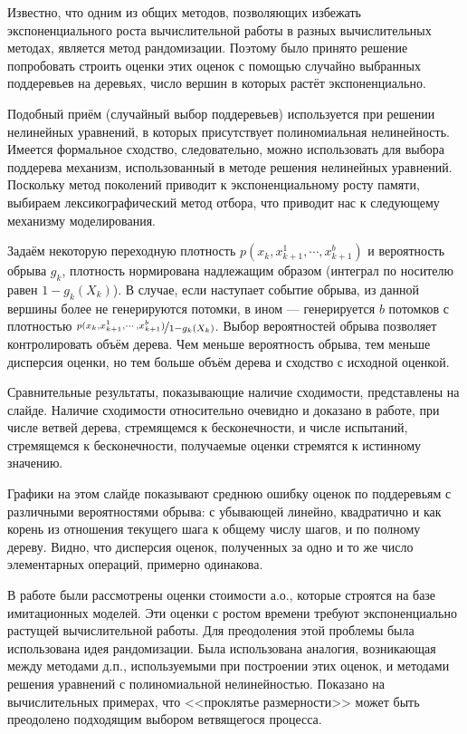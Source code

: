 \documentclass{article}
\begin{document}
Известно, что одним из общих методов, позволяющих избежать экспоненциального роста вычислительной работы в разных вычислительных методах, является метод рандомизации. Поэтому было принято решение попробовать строить оценки этих оценок с помощью случайно  выбранных поддеревьев на деревьях, число вершин в которых растёт экспоненциально.

Подобный приём (случайный выбор поддеревьев) используется при решении нелинейных уравнений, в которых присутствует полиномиальная нелинейность. Имеется формальное сходство, следовательно, можно использовать для выбора поддерева механизм, использованный в методе решения нелинейных уравнений. Поскольку метод поколений приводит к экспоненциальному росту памяти, выбираем лексикографический метод отбора, что приводит нас к следующему механизму моделирования.

Задаём некоторую переходную плотность $p(x_k, x_{k+1}^1, \cdots, x_{k+1}^b)$ и вероятность обрыва $g_k$, плотность нормирована надлежащим образом (интеграл по носителю равен $1-g_k(X_k)$). В случае, если наступает событие обрыва, из данной вершины более не генерируются потомки, в ином --- генерируется $b$ потомков с плотностью $\nicefrac{p(x_k, x_{k+1}^1, \cdots, x_{k+1}^b)}{1 - g_k(X_k)}$. Выбор вероятностей обрыва позволяет контролировать объём дерева. Чем меньше  вероятность обрыва, тем меньше дисперсия оценки, но тем больше объём дерева и сходство с исходной оценкой.

Сравнительные результаты, показывающие наличие сходимости, представлены на слайде. Наличие сходимости относительно очевидно и доказано в работе, при числе ветвей дерева, стремящемся к бесконечности, и числе испытаний, стремящемся к бесконечности, получаемые оценки стремятся к истинному значению.

Графики на этом слайде показывают среднюю ошибку оценок по поддеревьям с различными вероятностями обрыва: с убывающей линейно, квадратично и как корень из отношения текущего шага к общему числу шагов, и по полному дереву. Видно, что дисперсия оценок, полученных за одно и то же число элементарных операций, примерно одинакова.

В работе были рассмотрены оценки стоимости а.о., которые строятся на базе имитационных моделей. Эти оценки с ростом времени требуют экспоненциально растущей вычислительной работы. Для преодоления этой проблемы была использована идея рандомизации. Была использована аналогия, возникающая между методами д.п., используемыми при построении этих оценок, и методами решения уравнений с полиномиальной нелинейностью. Показано на вычислительных примерах, что <<проклятье размерности>> может быть преодолено подходящим выбором ветвящегося процесса.
\end{document}

